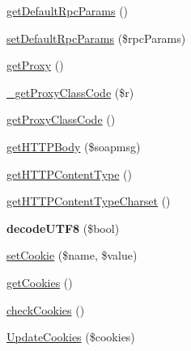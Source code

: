 \begin{DoxyCompactItemize}
\item 
\hyperlink{classsoapclient_a95ae30619429aa7d1c93f21e33300419}{get\-Default\-Rpc\-Params} ()
\item 
\hyperlink{classsoapclient_a9d7b3609d1db3eb5f2d3cf92510e4e6b}{set\-Default\-Rpc\-Params} (\$rpc\-Params)
\item 
\hyperlink{classsoapclient_a839ac5be1fce2af15c73aef02a49a8af}{get\-Proxy} ()
\item 
\hyperlink{classsoapclient_a2b49882c792a4deb80ec35ca75f1fee6}{\-\_\-get\-Proxy\-Class\-Code} (\$r)
\item 
\hyperlink{classsoapclient_a5fbf58b6ba27a02544885d4fc801d328}{get\-Proxy\-Class\-Code} ()
\item 
\hyperlink{classsoapclient_ab1e22b0858bdbe61d2d711ff442c0e78}{get\-H\-T\-T\-P\-Body} (\$soapmsg)
\item 
\hyperlink{classsoapclient_a2bed19ef2d537dee244535339cd6026a}{get\-H\-T\-T\-P\-Content\-Type} ()
\item 
\hyperlink{classsoapclient_a9051db33a9b7e50315d9222ef1c52ce9}{get\-H\-T\-T\-P\-Content\-Type\-Charset} ()
\item 
\hypertarget{classsoapclient_a8ebcfd008049181e64a5046eb8c168b9}{{\bfseries decode\-U\-T\-F8} (\$bool)}\label{classsoapclient_a8ebcfd008049181e64a5046eb8c168b9}

\item 
\hyperlink{classsoapclient_a3f05f631ff936a033cae038052d9e7f9}{set\-Cookie} (\$name, \$value)
\item 
\hyperlink{classsoapclient_a374b645410526cbbb498b140242a00ba}{get\-Cookies} ()
\item 
\hyperlink{classsoapclient_a6a8794beffec4a05daa7559ab233875e}{check\-Cookies} ()
\item 
\hyperlink{classsoapclient_ad71447ce0ee50309eea6ce0e12a88e02}{Update\-Cookies} (\$cookies)
\end{DoxyCompactItemize}
